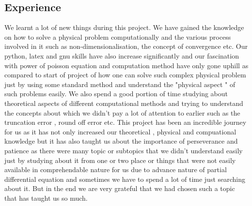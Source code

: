 \subsection{Experience}
We learnt a lot of new things during this project. We have gained the knowledge on how to solve a physical problem computationally and the various process involved in it such as non-dimensionalisation, the concept of convergence etc. Our python, latex and gnu skills have also increase significantly and our fascination with power of poisson equation and computation method have only gone uphill as compared to start of project of how one can solve such complex physical problem just by using some standard method and understand the "physical aspect " of such problems easily. We also spend a good portion of time studying about theoretical aspects of different computational methods and trying to understand the concepts about which we didn't pay a lot of attention to earlier such as the truncation error , round off error etc. This project has been an incredible journey for us as it has not only increased our theoretical , physical and compuational knowledge but it has also taught us about the importance of perseverance and patience as there were many topic or subtopics that we didn't understand easily just by studying about it from one or two place or things that were not easily available in comprehendable nature for us due to advance nature of partial differential equation and sometimes we have to spend a lot of time just searching about it. But in the end we are very grateful that we had chosen such a topic that has taught us so much. 
